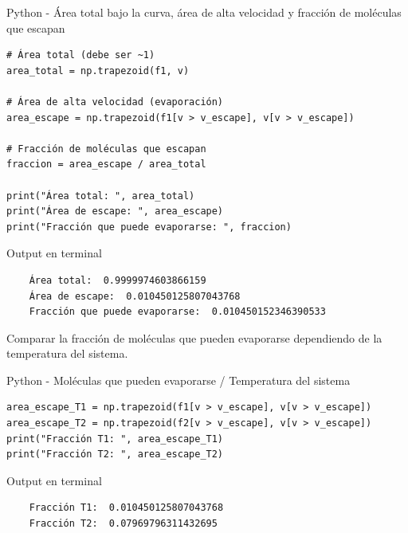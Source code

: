 \documentclass[a4paper, 11pt]{article}
\begin{document}
\vspace{0.3cm}
 Python - Área total bajo la curva, área de alta velocidad y fracción de moléculas que escapan
\begin{lstlisting}
# Área total (debe ser ~1)
area_total = np.trapezoid(f1, v)

# Área de alta velocidad (evaporación)
area_escape = np.trapezoid(f1[v > v_escape], v[v > v_escape])

# Fracción de moléculas que escapan
fraccion = area_escape / area_total

print("Área total: ", area_total)
print("Área de escape: ", area_escape)
print("Fracción que puede evaporarse: ", fraccion)
\end{lstlisting}

\vspace{0.3cm}
 Output en terminal
\vspace{-0.5cm}
\begin{verbatim}
    Área total:  0.9999974603866159
    Área de escape:  0.010450125807043768
    Fracción que puede evaporarse:  0.010450152346390533
\end{verbatim}

Comparar la fracción de moléculas que pueden evaporarse dependiendo de la temperatura del sistema. \par
\vspace{0.3cm}
 Python - Moléculas que pueden evaporarse / Temperatura del sistema
\begin{lstlisting}
area_escape_T1 = np.trapezoid(f1[v > v_escape], v[v > v_escape])
area_escape_T2 = np.trapezoid(f2[v > v_escape], v[v > v_escape])
print("Fracción T1: ", area_escape_T1)
print("Fracción T2: ", area_escape_T2)
\end{lstlisting}

\vspace{0.3cm}
 Output en terminal
\vspace{-0.5cm}
\begin{verbatim}
    Fracción T1:  0.010450125807043768
    Fracción T2:  0.07969796311432695
\end{verbatim}
\end{document}

